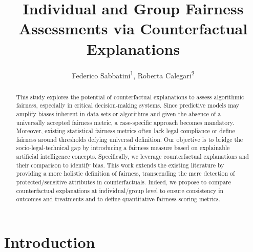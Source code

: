 \documentclass[letterpaper]{article} %
\title{Individual and Group Fairness Assessments via Counterfactual Explanations}
\author{
    Federico Sabbatini\textsuperscript{\rm 1}, Roberta Calegari\textsuperscript{\rm 2}
}
\begin{document}
\maketitle

\begin{abstract}
This study explores the potential of counterfactual explanations to assess algorithmic fairness, especially in critical decision-making systems. Since predictive models may amplify biases inherent in data sets or algorithms and given the absence of a universally accepted fairness metric, a case-specific approach becomes mandatory. Moreover, existing statistical fairness metrics often lack legal compliance or define fairness around thresholds defying universal definition.
%
Our objective is to bridge the socio-legal-technical gap by introducing a fairness measure based on explainable artificial intelligence concepts. Specifically, we leverage counterfactual explanations and their comparison to identify bias. This work extends the existing literature by providing a more holistic definition of fairness, transcending the mere detection of protected/sensitive attributes in counterfactuals. Indeed, we propose to compare counterfactual explanations at individual/group level to ensure consistency in outcomes and treatments and to define quantitative fairness scoring metrics.
%
\end{abstract}

%

\section{Introduction}\label{sec:introduction}
\end{document}
